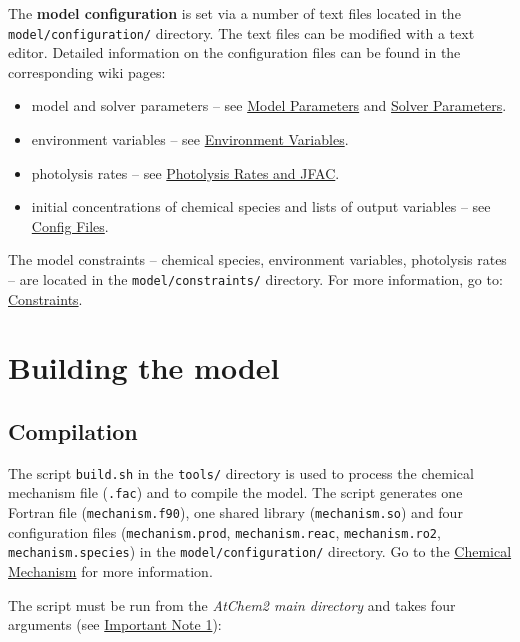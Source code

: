 The \textbf{model configuration} is set via a number of text files
located in the \texttt{model/configuration/} directory. The text files
can be modified with a text editor. Detailed information on the
configuration files can be found in the corresponding wiki pages:

\begin{itemize}
\item model and solver parameters -- see
  \hyperref[sec:parameters]{Model Parameters} and
  \hyperref[sec:solver]{Solver Parameters}.
\item environment variables -- see \hyperref[sec:envvar]{Environment
    Variables}.
\item photolysis rates -- see \hyperref[sec:photolysis]{Photolysis
    Rates and JFAC}.
\item initial concentrations of chemical species and lists of output
  variables -- see \hyperref[sec:config]{Config Files}.
\end{itemize}

The model constraints -- chemical species, environment variables,
photolysis rates -- are located in the \texttt{model/constraints/}
directory. For more information, go to:
\hyperref[sec:constraints]{Constraints}.

\section{Building the model} \label{sec:build}

\subsection{Compilation} \label{subsec:compilation}

The script \texttt{build.sh} in the \texttt{tools/} directory is used
to process the chemical mechanism file (\texttt{.fac}) and to compile
the model. The script generates one Fortran file
(\texttt{mechanism.f90}), one shared library (\texttt{mechanism.so})
and four configuration files (\texttt{mechanism.prod},
\texttt{mechanism.reac}, \texttt{mechanism.ro2},
\texttt{mechanism.species}) in the \texttt{model/configuration/}
directory. Go to the \hyperref[sec:mechanism]{Chemical Mechanism} for
more information.

The script must be run from the \emph{AtChem2 main directory} and
takes four arguments (see \hyperref[important-note-1]{Important Note
  1}):

